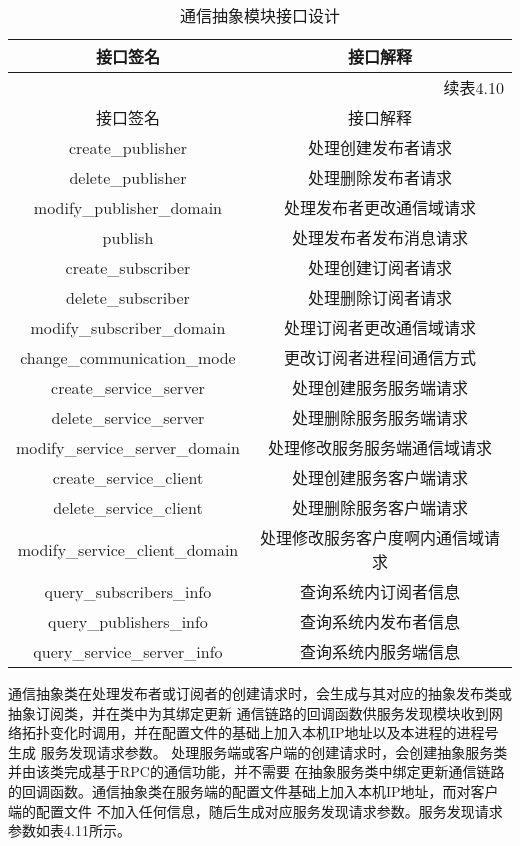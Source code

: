 \begin{longtable}{cc}
  \caption{通信抽象模块接口设计}\label{tab1}\\
  \toprule
  接口签名 & 接口解释 \\
  \midrule
  \endfirsthead
  
  \multicolumn{2}{r}{续表4.10}\\
  \toprule
  接口签名 & 接口解释 \\
  \hline
  \endhead
  
  \endfoot
  
  \bottomrule
  \endlastfoot
  create\_publisher & 处理创建发布者请求\\
  delete\_publisher & 处理删除发布者请求\\
  modify\_publisher\_domain & 处理发布者更改通信域请求\\
  publish & 处理发布者发布消息请求 \\
  create\_subscriber & 处理创建订阅者请求\\
  delete\_subscriber & 处理删除订阅者请求\\
  modify\_subscriber\_domain & 处理订阅者更改通信域请求\\ 
  change\_communication\_mode & 更改订阅者进程间通信方式 \\
  create\_service\_server & 处理创建服务服务端请求\\
  delete\_service\_server & 处理删除服务服务端请求\\
  modify\_service\_server\_domain & 处理修改服务服务端通信域请求\\
  create\_service\_client & 处理创建服务客户端请求\\
  delete\_service\_client & 处理删除服务客户端请求\\
  modify\_service\_client\_domain & 处理修改服务客户度啊内通信域请求\\
  query\_subscribers\_info & 查询系统内订阅者信息\\
  query\_publishers\_info & 查询系统内发布者信息\\
  query\_service\_server\_info & 查询系统内服务端信息\\
  \end{longtable}  

通信抽象类在处理发布者或订阅者的创建请求时，会生成与其对应的抽象发布类或抽象订阅类，并在类中为其绑定更新
通信链路的回调函数供服务发现模块收到网络拓扑变化时调用，并在配置文件的基础上加入本机IP地址以及本进程的进程号生成
服务发现请求参数。
处理服务端或客户端的创建请求时，会创建抽象服务类并由该类完成基于RPC的通信功能，并不需要
在抽象服务类中绑定更新通信链路的回调函数。通信抽象类在服务端的配置文件基础上加入本机IP地址，而对客户端的配置文件
不加入任何信息，随后生成对应服务发现请求参数。服务发现请求参数如表4.11所示。


